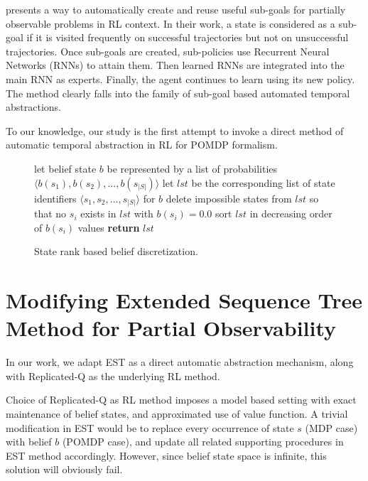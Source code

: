 \documentclass[10pt, conference, compsocconf]{IEEEtran}
\newenvironment{boxedalgorithmic}
  {\begin{lrbox}{\ieeealgbox}
   \begin{minipage}{\dimexpr\columnwidth-2\fboxsep-2\fboxrule}
   \begin{algorithmic}[1]}
  {\end{algorithmic}
   \end{minipage}
   \end{lrbox}\noindent\fbox{\usebox{\ieeealgbox}}}
\begin{document}
\cite{dung_reinforcement_2007} presents a way to automatically create and reuse useful sub-goals for partially observable problems in RL context. In their work, a state is considered as a sub-goal if it is visited frequently on successful trajectories but not on unsuccessful trajectories. Once sub-goals are created, sub-policies use Recurrent Neural Networks (RNNs) to attain them. Then learned RNNs are integrated into the main RNN as experts. Finally, the agent continues to learn using its new policy. The method clearly falls into the family of sub-goal based automated temporal abstractions.

To our knowledge, our study is the first attempt to invoke a direct method of automatic temporal abstraction in RL for POMDP formalism.

\begin{figure}[t]
\begin{boxedalgorithmic}
\State let belief state $b$ be represented by a list of probabilities $\langle b(s_1), b(s_2), ..., b(s_{|S|}) \rangle$
\State let $lst$ be the corresponding list of state identifiers $\langle s_1, s_2, ..., s_{|S|} \rangle$ for $b$
\State delete impossible states from $lst$ so that no $s_i$ exists in $lst$ with $b(s_i)=0.0$
\State sort $lst$ in decreasing order of $b(s_i)$ values
\State \textbf{return} $lst$
\EndFunction
\end{boxedalgorithmic}
\caption{State rank based belief discretization.}
\label{alg:belief_discretization}
\end{figure}



\section{Modifying Extended Sequence Tree Method for Partial Observability}
\label{sec:ext_seq_using_belief_state}

In our work, we adapt EST as a direct automatic abstraction mechanism, along with Replicated-Q as the underlying RL method.

Choice of Replicated-Q as RL method imposes a model based setting with exact maintenance of belief states, and approximated use of value function. A trivial modification in EST would be to replace every occurrence of state $s$ (MDP case) with belief $b$ (POMDP case), and update all related supporting procedures in EST method accordingly. However, since belief state space is infinite, this solution will obviously fail.
\end{document}
